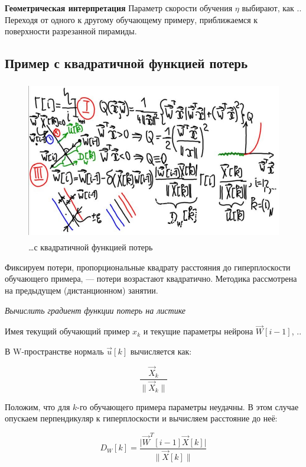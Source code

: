 \documentclass{article}
\numberwithin{equation}{subsection}
\begin{document}
\textbf{Геометрическая интерпретация}
Параметр скорости обучения $\eta$ выбирают, как .. 
Переходя от одного к другому обучающему примеру, приближаемся к поверхности разрезанной 
пирамиды.

\subsection{Пример с квадратичной функцией потерь}

\begin{figure}[htbp]
    \centering
    \includegraphics[height=7cm]{hyperflat_8_1.jpeg}
    \caption{\dots с квадратичной функцией потерь}
    \label{hyperflat_8_1}
\end{figure}

Фиксируем потери, пропорциональные квадрату расстояния до гиперплоскости обучающего 
примера, --- потери возрастают квадратично. Методика рассмотрена на предыдущем 
(дистанционном) занятии.

\begin{myquote}
    \textit{Вычислить градиент функции потерь на листике}
\end{myquote}

Имея текущий обучающий пример $x_k$ и текущие параметры нейрона $\vec{W}[i-1]$,
..

В W-пространстве нормаль $\vec{u}[k]$ вычисляется как: 

\begin{equation}
    \dfrac{\vec{X}_k}{\| \vec{X}_k \|}
\end{equation}

Положим, что для $k$-го обучающего примера параметры неудачны. В этом случае опускаем перпендикуляр
к гиперплоскости и вычисляем расстояние до неё:

\begin{equation}
    D_W [k] = \dfrac{\lvert \vec{W}^T [i-1] \vec{X}[k] \rvert}{\| \vec{X}[k] \|}
\end{equation}
\end{document}
